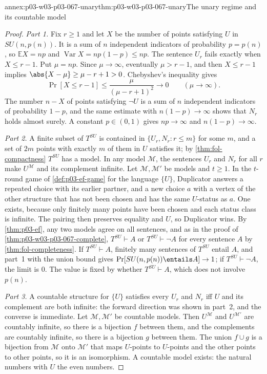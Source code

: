 \begin{annexitem}{annex:p03-w03-p03-067-unary}{thm:p03-w03-p03-067-unary}{The unary regime and its countable model}
\begin{proof}
\emph{Part 1.}  Fix \(r\geq1\) and let \(X\) be the number of points
satisfying \(U\) in \(SU(n,p(n))\).  It is a sum of \(n\) independent
indicators of probability \(p=p(n)\), so \(\mathbb E X=np\) and
\(\operatorname{Var}X=np(1-p)\leq np\).  The sentence \(U_r\) fails exactly
when \(X\leq r-1\).  Put \(\mu=np\).  Since \(\mu\to\infty\), eventually
\(\mu>r-1\), and then \(X\leq r-1\) implies \(\abs{X-\mu}\geq\mu-r+1>0\).
Chebyshev's inequality gives
\[
 \Pr[X\leq r-1]\leq\frac{\mu}{(\mu-r+1)^2}\longrightarrow0
 \qquad(\mu\to\infty).
\]
The number \(n-X\) of points satisfying \(\neg U\) is a sum of \(n\)
independent indicators of probability \(1-p\), and the same estimate with
\(n(1-p)\to\infty\) shows that \(N_r\) holds almost surely.  A constant
\(p\in(0,1)\) gives \(np\to\infty\) and \(n(1-p)\to\infty\).

\emph{Part 2.}  A finite subset of \(T^{SU}\) is contained in
\(\{U_r,N_r:r\leq m\}\) for some \(m\), and a set of \(2m\) points with exactly
\(m\) of them in \(U\) satisfies it; by \cref{thm:fol-compactness}
\(T^{SU}\) has a model.  In any model \(\mathcal M\), the sentences \(U_r\)
and \(N_r\) for all \(r\) make \(U^{\mathcal M}\) and its complement
infinite.  Let \(\mathcal M,\mathcal M'\) be models and \(t\geq1\).  In the
\(t\)-round game of \cref{def:p03-ef-game} for the language \(\{U\}\),
Duplicator answers a repeated choice with its earlier partner, and a new
choice \(a\) with a vertex of the other structure that has not been chosen and
has the same \(U\)-status as \(a\).  One exists, because only finitely many
points have been chosen and each status class is infinite.  The pairing
then preserves equality and \(U\), so Duplicator wins.  By \cref{thm:p03-ef},
any two models agree on all sentences, and as in the proof of
\cref{thm:p03-w03-p03-067-complete}, \(T^{SU}\vdash A\) or
\(T^{SU}\vdash\neg A\) for every sentence \(A\) by
\cref{thm:fol-completeness}.  If \(T^{SU}\vdash A\), finitely many sentences
of \(T^{SU}\) entail \(A\), and part~1 with the union bound gives
\(\Pr[SU(n,p(n))\entails A]\to1\); if \(T^{SU}\vdash\neg A\), the limit is
\(0\).  The value is fixed by whether \(T^{SU}\vdash A\), which does not
involve \(p(n)\).

\emph{Part 3.}  A countable structure for \(\{U\}\) satisfies every \(U_r\)
and \(N_r\) iff \(U\) and its complement are both infinite: the forward
direction was shown in part~2, and the converse is immediate.  Let
\(\mathcal M,\mathcal M'\) be countable models.  Then \(U^{\mathcal M}\) and
\(U^{\mathcal M'}\) are countably infinite, so there is a bijection \(f\)
between them, and the complements are countably infinite, so there is a
bijection \(g\) between them.  The union \(f\cup g\) is a bijection from
\(\mathcal M\) onto \(\mathcal M'\) that maps \(U\)-points to \(U\)-points and
the other points to other points, so it is an isomorphism.  A countable model
exists: the natural numbers with \(U\) the even numbers.
\end{proof}
\end{annexitem}

